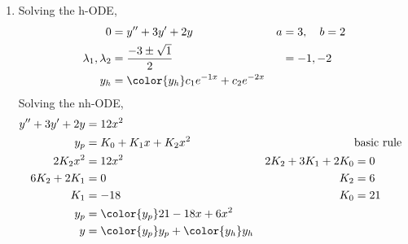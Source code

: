 \begin{enumerate}
    \item Solving the h-ODE,
          \begin{align}
              0                        & = y'' + 3y' + 2y                          & a & = 3, \quad b = 2 \\
              \lambda_{1}, \lambda_{2} & = \frac{-3 \pm \sqrt{1}}{2}               &   & = -1, -2         \\
              y_{h}                    & = \color{y_h} c_{1}e^{-1x} + c_{2}e^{-2x}
          \end{align}
          Solving the nh-ODE,
          \begin{align}
              y'' + 3y' + 2y  & = 12x^{2}                                                                                  \\
              y_{p}           & = K_{0} + K_{1}x + K_{2}x^{2}               &                          & \text{basic rule} \\
              2K_{2}x^{2}     & = 12x^{2}                                   & 2K_{2} + 3K_{1} + 2K_{0} & = 0               \\
              6K_{2} + 2K_{1} & = 0                                         & K_{2}                    & = 6               \\
              K_{1}           & = -18                                       & K_{0}                    & = 21              \\
              y_{p}           & = \color{y_p} 21 - 18x + 6x^{2}                                                            \\
              y               & = {\color{y_p} y_{p}} + {\color{y_h} y_{h}}
          \end{align}


\end{enumerate}
